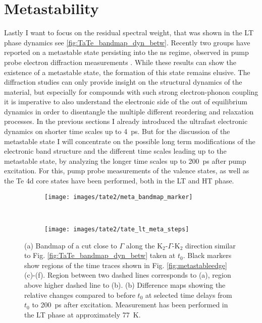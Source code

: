 \section{Metastability}
\label{sec:meta}

Lastly I want to focus on the residual spectral weight, that was shown in the LT phase dynamics see \ref{fig:TaTe_bandmap_dyn_betw}.
Recently two groups have reported on a metastable state persisting into the \unit{\nano\second} regime, observed in pump probe electron diffraction measurements \cite{siddiqui_ultrafast_2021, domrose_femtosecond_2024}.
While these results can show the existence of a metastable state, the formation of this state remains elusive.
The diffraction studies can only provide insight on the structural dynamics of the material, but especially for compounds with such strong electron-phonon coupling it is imperative to also understand the electronic side of the out of equilibrium dynamics in order to disentangle the multiple different reordering and relaxation processes.
In the previous sections I already introduced the ultrafast electronic dynamics on shorter time scales up to \qty{4}{\pico\second}.
But for the discussion of the metastable state I will concentrate on the possible long term modifications of the electronic band structure and the different time scales leading up to the metastable state, by analyzing the longer time scales up to \qty{200}{\pico\second} after pump excitation.
For this, pump probe measurements of the valence states, as well as the Te 4d core states have been performed, both in the LT and HT phase.

\begin{figure}[b!]
	\centering
	\begin{subfigure}[b]{0.25\textwidth}
		\texttt{[image: images/tate2/meta\_bandmap\_marker]}
		\caption{}
	\end{subfigure}
	\\
	\begin{subfigure}[b]{\textwidth}
		\texttt{[image: images/tate2/tate\_lt\_meta\_steps]}
		\caption{}
	\end{subfigure}
	\caption{(a) Bandmap of a cut close to $\Gamma$ along the K$_2$-$\Gamma$-K$_2$ direction similar to Fig. \ref{fig:TaTe_bandmap_dyn_betw} taken at $t_0$. Black markers show regions of the time traces shown in Fig. \ref{fig:metastableedge} (c)-(f). Region between two dashed lines corresponds to (a), region above higher dashed line to (b). (b) Difference maps showing the relative changes compared to before $t_0$ at selected time delays from $t_0$ to \qty{200}{\pico\second} after excitation. Measurement has been performed in the LT phase at approximately \qty{77}{\kelvin}.}
	\label{fig:tateltmetasteps}
\end{figure}

